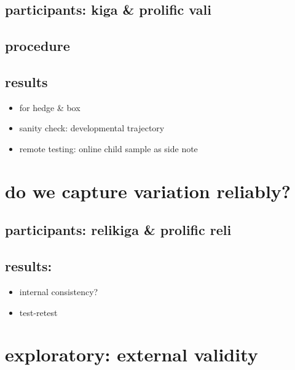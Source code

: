 \documentclass[
  man,floatsintext]{apa6}
\providecommand{\tightlist}{%
  \setlength{\itemsep}{0pt}\setlength{\parskip}{0pt}}
\begin{document}
\hypertarget{participants-kiga-prolific-vali}{%
\subsection{participants: kiga \& prolific vali}\label{participants-kiga-prolific-vali}}

\hypertarget{procedure}{%
\subsection{procedure}\label{procedure}}

\hypertarget{results}{%
\subsection{results}\label{results}}

\begin{itemize}
\tightlist
\item
  for hedge \& box
\item
  sanity check: developmental trajectory
\item
  remote testing: online child sample as side note
\end{itemize}

\hypertarget{do-we-capture-variation-reliably}{%
\section{do we capture variation reliably?}\label{do-we-capture-variation-reliably}}

\hypertarget{participants-relikiga-prolific-reli}{%
\subsection{participants: relikiga \& prolific reli}\label{participants-relikiga-prolific-reli}}

\hypertarget{results-1}{%
\subsection{results:}\label{results-1}}

\begin{itemize}
\tightlist
\item
  internal consistency?
\item
  test-retest
\end{itemize}

\hypertarget{exploratory-external-validity}{%
\section{exploratory: external validity}\label{exploratory-external-validity}}
\end{document}

